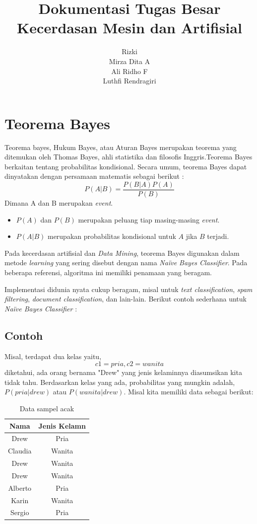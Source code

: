 \documentclass[11pt,a4paper]{report}
\author{
	Rizki\\
	Mirza Dita A\\
	Ali Ridho F\\
	Luthfi Rendragiri
}
\date{}
\title{
	\textbf{Dokumentasi Tugas Besar}\\
	\textbf{Kecerdasan Mesin dan Artifisial}
}
\begin{document}
	\maketitle
	\section*{Teorema Bayes}
	Teorema bayes, Hukum Bayes, atau Aturan Bayes merupakan teorema yang ditemukan oleh Thomas Bayes, ahli statistika dan filosofis Inggris.Teorema Bayes berkaitan tentang probabilitas kondisional. Secara umum, teorema Bayes dapat dinyatakan dengan persamaan matematis sebagai berikut :
	\[ P(A|B)=\frac{P(B|A)P(A)}{P(B)} \]
	Dimana A dan B merupakan \emph{event}.
	\begin{itemize}
		\item $P(A)$ dan $P(B)$ merupakan peluang tiap masing-masing \emph{event}.
		\item $P(A|B)$ merupakan probabilitas kondisional untuk $A$ jika $B$ terjadi.
	\end{itemize} 
	
	Pada kecerdasan artifisial dan \emph{Data Mining}, teorema Bayes digunakan dalam metode \emph{learning} yang sering disebut dengan nama \emph{Na\"{i}ve Bayes Classifier}. Pada beberapa referensi, algoritma ini memiliki penamaan yang beragam.
	
	Implementasi didunia nyata cukup beragam, misal untuk \emph{text classification}, \emph{spam filtering}, \emph{document classification}, dan lain-lain. Berikut contoh sederhana untuk \emph{Na\"{i}ve Bayes Classifier} : 
	\subsection*{Contoh}
	Misal, terdapat dua kelas yaitu,
	\[ c1=pria, c2=wanita \]
	diketahui, ada orang bernama "Drew" yang jenis kelaminnya diasumsikan kita tidak tahu. Berdasarkan kelas yang ada, probabilitas yang mungkin adalah, $P(pria|drew)$ atau $P(wanita|drew)$.
	Misal kita memiliki data sebagai berikut:
	
	\begin{table}[h]
		\centering
		\begin{tabular}{|c|c|}
			\hline Nama & Jenis Kelamn \\ 
			\hline Drew & Pria \\ 
			\hline Claudia & Wanita \\ 
			\hline Drew & Wanita \\ 
			\hline Drew & Wanita \\ 
			\hline Alberto & Pria \\ 
			\hline Karin & Wanita \\ 
			\hline Sergio & Pria \\ 
			\hline 
		\end{tabular}
		\caption{Data sampel acak}
	\end{table} 
	
\end{document}
